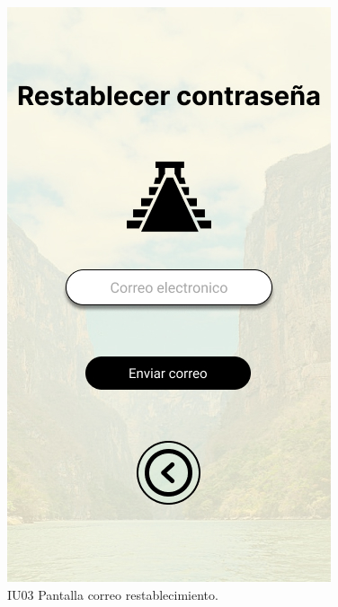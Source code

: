 \begin{figure}[h]
    \begin{minipage}{0.5\textwidth}
        \centering
        \includegraphics[width=.7\linewidth]{Pantallas Prototipo3/IU03 Pantalla correo restablecimiento.jpg}
        \caption{IU03 Pantalla correo restablecimiento.}
    \end{minipage}
    

\end{figure}
